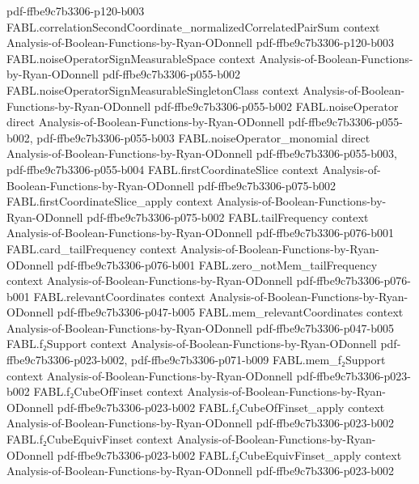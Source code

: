 \begin{theorem}
  {pdf-ffbe9c7b3306-p120-b003}
\proofstep
  {FABL.correlationSecondCoordinate_normalizedCorrelatedPairSum}
  {context}
  {Analysis-of-Boolean-Functions-by-Ryan-ODonnell}
  {pdf-ffbe9c7b3306-p120-b003}
\proofstep
  {FABL.noiseOperatorSignMeasurableSpace}
  {context}
  {Analysis-of-Boolean-Functions-by-Ryan-ODonnell}
  {pdf-ffbe9c7b3306-p055-b002}
\proofstep
  {FABL.noiseOperatorSignMeasurableSingletonClass}
  {context}
  {Analysis-of-Boolean-Functions-by-Ryan-ODonnell}
  {pdf-ffbe9c7b3306-p055-b002}
\proofstep
  {FABL.noiseOperator}
  {direct}
  {Analysis-of-Boolean-Functions-by-Ryan-ODonnell}
  {pdf-ffbe9c7b3306-p055-b002,
    pdf-ffbe9c7b3306-p055-b003}
\proofstep
  {FABL.noiseOperator_monomial}
  {direct}
  {Analysis-of-Boolean-Functions-by-Ryan-ODonnell}
  {pdf-ffbe9c7b3306-p055-b003,
    pdf-ffbe9c7b3306-p055-b004}
\proofstep
  {FABL.firstCoordinateSlice}
  {context}
  {Analysis-of-Boolean-Functions-by-Ryan-ODonnell}
  {pdf-ffbe9c7b3306-p075-b002}
\proofstep
  {FABL.firstCoordinateSlice_apply}
  {context}
  {Analysis-of-Boolean-Functions-by-Ryan-ODonnell}
  {pdf-ffbe9c7b3306-p075-b002}
\proofstep
  {FABL.tailFrequency}
  {context}
  {Analysis-of-Boolean-Functions-by-Ryan-ODonnell}
  {pdf-ffbe9c7b3306-p076-b001}
\proofstep
  {FABL.card_tailFrequency}
  {context}
  {Analysis-of-Boolean-Functions-by-Ryan-ODonnell}
  {pdf-ffbe9c7b3306-p076-b001}
\proofstep
  {FABL.zero_notMem_tailFrequency}
  {context}
  {Analysis-of-Boolean-Functions-by-Ryan-ODonnell}
  {pdf-ffbe9c7b3306-p076-b001}
\proofstep
  {FABL.relevantCoordinates}
  {context}
  {Analysis-of-Boolean-Functions-by-Ryan-ODonnell}
  {pdf-ffbe9c7b3306-p047-b005}
\proofstep
  {FABL.mem_relevantCoordinates}
  {context}
  {Analysis-of-Boolean-Functions-by-Ryan-ODonnell}
  {pdf-ffbe9c7b3306-p047-b005}
\proofstep
  {FABL.f₂Support}
  {context}
  {Analysis-of-Boolean-Functions-by-Ryan-ODonnell}
  {pdf-ffbe9c7b3306-p023-b002,
    pdf-ffbe9c7b3306-p071-b009}
\proofstep
  {FABL.mem_f₂Support}
  {context}
  {Analysis-of-Boolean-Functions-by-Ryan-ODonnell}
  {pdf-ffbe9c7b3306-p023-b002}
\proofstep
  {FABL.f₂CubeOfFinset}
  {context}
  {Analysis-of-Boolean-Functions-by-Ryan-ODonnell}
  {pdf-ffbe9c7b3306-p023-b002}
\proofstep
  {FABL.f₂CubeOfFinset_apply}
  {context}
  {Analysis-of-Boolean-Functions-by-Ryan-ODonnell}
  {pdf-ffbe9c7b3306-p023-b002}
\proofstep
  {FABL.f₂CubeEquivFinset}
  {context}
  {Analysis-of-Boolean-Functions-by-Ryan-ODonnell}
  {pdf-ffbe9c7b3306-p023-b002}
\proofstep
  {FABL.f₂CubeEquivFinset_apply}
  {context}
  {Analysis-of-Boolean-Functions-by-Ryan-ODonnell}
  {pdf-ffbe9c7b3306-p023-b002}
\proofstep

\end{theorem}
